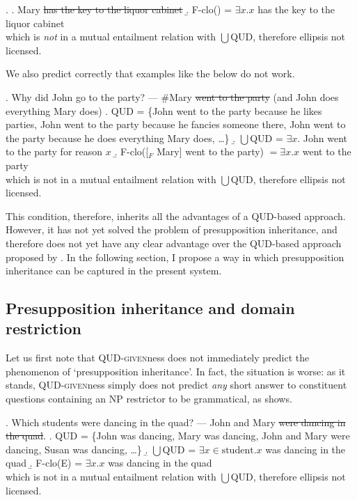 \documentclass[doublespace]{umthesis}
\newcommand{\pred}[1]{\ensuremath{\mathrm{{#1}}}}
\newcommand{\el}[1]{\sout{#1}}
\begin{document}
\ex. 	\a. Mary \sout{has the key to the liquor cabinet}
	\b. F-clo(\Last[a]) = $\exists x. x$ has the key to the liquor cabinet\\
	which is \emph{not} in a mutual entailment relation with $\bigcup$QUD, therefore ellipsis not licensed.

We also predict correctly that examples like the below do not work.

\ex. 	Why did John go to the party? --- \#Mary \sout{went to the party} (and John does everything Mary does)
	\a. QUD = \{John went to the party because he likes parties, John went to the party because he fancies someone there, John went to the party because he does everything Mary does, \ldots\}
	\b. $\bigcup$QUD = $\exists x.$ John went to the party for reason $x$
	\b. F-clo([$_F$ Mary] went to the party) $= \exists x. x$ went to the party\\
	which is not in a mutual entailment relation with $\bigcup$QUD, therefore ellipsis not licensed.
	
This condition, therefore, inherits all the advantages of a QUD-based approach. However, it has not yet solved the problem of presupposition inheritance, and therefore does not yet have any clear advantage over the QUD-based approach proposed by \cite{Re07}. %
In the following section, I propose a way in which presupposition inheritance can be captured in the present system.

\subsection{Presupposition inheritance and domain restriction}

Let us first note that \textsc{QUD-given}ness does not immediately predict the phenomenon of `presupposition inheritance'.
In fact, the situation is worse: as it stands, \textsc{QUD-given}ness simply does not predict \emph{any} short answer to constituent questions containing an NP restrictor to be grammatical, as \Next shows.

\ex. 	Which students were dancing in the quad? --- John and Mary \el{were dancing in the quad}.
	\a. QUD = \{John was dancing, Mary was dancing, John and Mary were dancing, Susan was dancing, \ldots\}
	\b. $\bigcup$QUD = $\exists x \in \pred{student}. x$ was dancing in the quad
	\b. F-clo(E) = $\exists x. x$ was dancing in the quad\\
	which is not in a mutual entailment relation with $\bigcup$QUD, therefore ellipsis not licensed.
	
\end{document}
